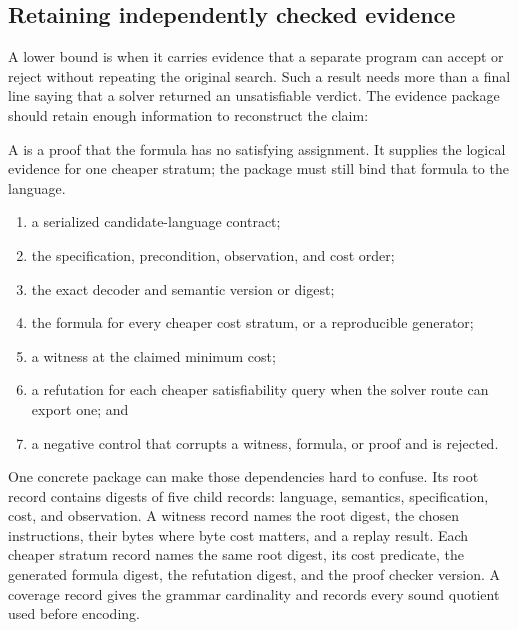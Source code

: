 \subsection{Retaining independently checked evidence}

A lower bound is  when it carries evidence that a separate program can
accept or reject without repeating the original search. Such a result needs
more than a final line saying that a solver returned an unsatisfiable verdict.
The evidence package should retain enough information to reconstruct the
claim:

A  is a proof that the formula has no satisfying
assignment. It supplies the logical evidence for one cheaper stratum; the
package must still bind that formula to the language.

\begin{enumerate}
\item a serialized candidate-language contract;
\item the specification, precondition, observation, and cost order;
\item the exact decoder and semantic version or digest;
\item the formula for every cheaper cost stratum, or a reproducible generator;
\item a witness at the claimed minimum cost;
\item a refutation for each cheaper satisfiability query when the solver route
can export one; and
\item a negative control that corrupts a witness, formula, or proof and is
rejected.
\end{enumerate}

One concrete package can make those dependencies hard to confuse. Its root
record contains digests of five child records: language, semantics,
specification, cost, and observation. A witness record names the root digest,
the chosen instructions, their bytes where byte cost matters, and a replay
result. Each cheaper stratum record names the same root digest, its cost
predicate, the generated formula digest, the refutation digest, and the proof
checker version. A coverage record gives the grammar cardinality and records
every sound quotient used before encoding.

